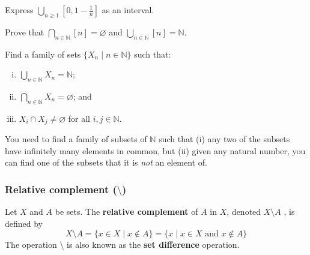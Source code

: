 

\begin{exercise}
Express $\displaystyle\bigcup_{n \ge 1} [0,1-\frac{1}{n}]$ as an interval.
\end{exercise}

\begin{exercise}
Prove that $\displaystyle\bigcap_{n \in \mathbb{N}} [n] = \varnothing$ and $\displaystyle\bigcup_{n \in \mathbb{N}} [n] = \mathbb{N}$.
\end{exercise}

\begin{exercise}
\label{exSubsetsFiniteIntersectionNon-emptyInfiniteIntersectionEmpty}
Find a family of sets $\{ X_n \mid n \in \mathbb{N} \}$ such that:
\begin{enumerate}[(i)]
\item $\displaystyle\bigcup_{n \in \mathbb{N}} X_n = \mathbb{N}$;
\item $\displaystyle\bigcap_{n \in \mathbb{N}} X_n = \varnothing$; and
\item $X_i \cap X_j \ne \varnothing$ for all $i,j \in \mathbb{N}$.
\end{enumerate}
\begin{backhint}
You need to find a family of subsets of $\mathbb{N}$ such that (i) any two of the subsets have infinitely many elements in common, but (ii) given any natural number, you can find one of the subsets that it is \textit{not} an element of.
\end{backhint}
\end{exercise}


\subsubsection*{Relative complement ($\setminus$)}

\begin{definition}
\label{defRelativeComplement}
Let $X$ and $A$ be sets. The \textbf{relative complement} of $A$ in $X$, denoted $X \setminus A$ , is defined by
\[ X \setminus A = \{ x \in X \mid x \not \in A \} = \{ x \mid x \in X \text{ and } x \not\in A \} \]
The operation $\setminus$ is also known as the \textbf{set difference} operation.
\end{definition}

